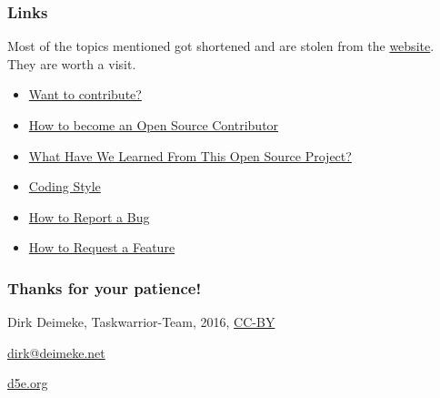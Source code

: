 \documentclass[t,handout]{beamer}
\begin{document}
\begin{frame}[fragile]\frametitle{Links}
    \vfill
    Most of the topics mentioned got shortened and are stolen from the \href{http://taskwarrior.org}{website}. They are worth a visit.

    \begin{itemize}
        \item \href{https://taskwarrior.org/docs/contribute.html}{Want to contribute?}
        \item \href{https://taskwarrior.org/docs/first_time.html}{How to become an Open Source Contributor}
        \item \href{https://taskwarrior.org/docs/advice.html}{What Have We Learned From This Open Source Project?}
        \item \href{https://taskwarrior.org/docs/coding_style.html}{Coding Style}
        \item \href{http://taskwarrior.org/docs/bugs.html}{How to Report a Bug}
        \item \href{http://taskwarrior.org/docs/features.html}{How to Request a Feature}
    \end{itemize}
\end{frame}

\begin{frame}[fragile]\frametitle{Thanks for your patience!}
    \vfill
    \begin{center}
        Dirk Deimeke, Taskwarrior-Team, 2016, \href{https://creativecommons.org/licenses/by/4.0/}{CC-BY}

        \href{mailto:dirk@deimeke.net}{dirk@deimeke.net}

        \href{https://d5e.org/}{d5e.org}
    \end{center}
\end{frame}
\end{document}
